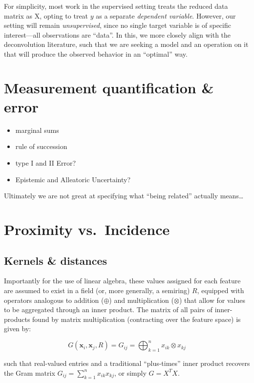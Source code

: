 \documentclass[%
	12pt,
		oneside,
		letterpaper
]{book}
\providecommand{\tightlist}{%
  \setlength{\itemsep}{0pt}\setlength{\parskip}{0pt}}\usepackage{longtable,booktabs,array}
\begin{document}
For simplicity, most work in the supervised setting treats the reduced
data matrix as X, opting to treat \(y\) as a separate \emph{dependent
variable}. However, our setting will remain \emph{unsupervised}, since
no single target variable is of specific interest---all observations are
``data''. In this, we more closely align with the deconvolution
literature, such that we are seeking a model and an operation on it that
will produce the observed behavior in an ``optimal'' way.

\section{Measurement quantification \&
error}\label{measurement-quantification-error}

\begin{itemize}
\tightlist
\item
  marginal sums
\item
  rule of succession
\item
  type I and II Error?
\item
  Epistemic and Alleatoric Uncertainty?
\end{itemize}

Ultimately we are not great at specifying what ``being related''
actually means\ldots{}

\section{Proximity vs.~Incidence}\label{proximity-vs.-incidence}

\subsection{Kernels \& distances}\label{kernels-distances}

Importantly for the use of linear algebra, these values assigned for
each feature are assumed to exist in a field (or, more generally, a
semiring) \(R\), equipped with operators analogous to addition
(\(\oplus\)) and multiplication (\(\otimes\)) that allow for values to
be aggregated through an inner product. The matrix of all pairs of
inner-products found by matrix multiplication (contracting over the
feature space) is given by:

\[G(\mathbf{x}_i, \mathbf{x}_j,R) = G_{ij} = \bigoplus_{k=1}^{n} x_{ik} \otimes x_{kj} \]

such that real-valued entries and a traditional ``plus-times'' inner
product recovers the Gram matrix \(G_{ij}=\sum_{k=1}^{n} x_{ik}x_{kj}\),
or simply \(G=X^TX\).
\end{document}
